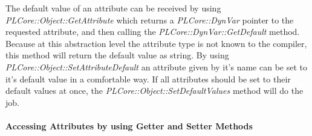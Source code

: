 The default value of an attribute can be received by using \emph{PLCore::Object::GetAttribute} which returns a \emph{PLCore::DynVar} pointer to the requested attribute, and then
calling the \emph{PLCore::DynVar::GetDefault} method. Because at this abstraction level the attribute type is not known to the compiler, this method will return the default value as string. By using \emph{PLCore::Object::SetAttributeDefault} an attribute given by it's name can be set to it's default value in a comfortable way. If all attributes should be set to their default values at once, the \emph{PLCore::Object::SetDefaultValues} method will do the job.


\paragraph{Accessing Attributes by using Getter and Setter Methods}
